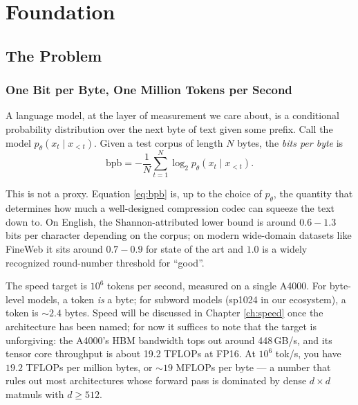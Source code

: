 \documentclass[11pt,openany]{book}
\theoremstyle{definition}
\theoremstyle{plain}
\newcommand{\bpb}{\text{bpb}}
\begin{document}
\mainmatter

\part{Foundation}

\chapter{The Problem}
\label{ch:problem}

\section{One Bit per Byte, One Million Tokens per Second}

A language model, at the layer of measurement we care about, is a
conditional probability distribution over the next byte of text given some
prefix. Call the model $p_\theta(x_t \mid x_{<t})$. Given a test corpus of
length $N$ bytes, the \emph{bits per byte} is
\begin{equation}
  \bpb = -\frac{1}{N}\sum_{t=1}^N \log_2 p_\theta(x_t \mid x_{<t}).
  \label{eq:bpb}
\end{equation}

This is not a proxy. Equation \ref{eq:bpb} is, up to the choice of $p_\theta$,
the quantity that determines how much a well-designed compression codec can
squeeze the text down to. On English, the Shannon-attributed lower bound is
around $0.6{-}1.3$ bits per character depending on the corpus; on modern
wide-domain datasets like FineWeb it sits around $0.7{-}0.9$ for state of
the art and $1.0$ is a widely recognized round-number threshold for
``good''.

The speed target is $10^6$ tokens per second, measured on a single A4000. For
byte-level models, a token \emph{is} a byte; for subword models (sp1024 in
our ecosystem), a token is $\sim 2.4$ bytes. Speed will be discussed in
Chapter \ref{ch:speed} once the architecture has been named; for now it
suffices to note that the target is unforgiving: the A4000's HBM bandwidth
tops out around 448\,GB/s, and its tensor core throughput is about 19.2
TFLOPs at FP16. At $10^6$ tok/s, you have $19.2$ TFLOPs per million bytes,
or $\sim 19$ MFLOPs per byte --- a number that rules out most architectures
whose forward pass is dominated by dense $d \times d$ matmuls with $d \geq
512$.
\end{document}
